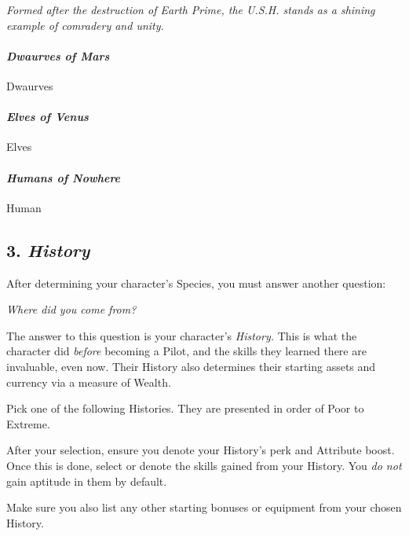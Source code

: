 \documentclass[
]{article}
\begin{document}
\emph{Formed after the destruction of Earth Prime, the U.S.H. stands as
a shining example of comradery and unity.}

\hypertarget{dwaurves-of-mars}{%
\paragraph{\texorpdfstring{\emph{Dwaurves of
Mars}}{Dwaurves of Mars}}\label{dwaurves-of-mars}}

{Dwaurves}

\hypertarget{elves-of-venus}{%
\paragraph{\texorpdfstring{\emph{Elves of
Venus}}{Elves of Venus}}\label{elves-of-venus}}

{Elves}

\hypertarget{humans-of-nowhere}{%
\paragraph{\texorpdfstring{\emph{Humans of
Nowhere}}{Humans of Nowhere}}\label{humans-of-nowhere}}

{Human}

\hypertarget{history}{%
\subsection{\texorpdfstring{3.
\emph{History}}{3. History}}\label{history}}

After determining your character's Species, you must answer another
question:

\emph{Where did you come from?}

The answer to this question is your character's \emph{History.} This is
what the character did \emph{before} becoming a Pilot, and the skills
they learned there are invaluable, even now. Their History also
determines their starting assets and currency via a measure of Wealth.

Pick one of the following Histories. They are presented in order of Poor
to Extreme.

After your selection, ensure you denote your History's perk and
Attribute boost. Once this is done, select or denote the skills gained
from your History. You \emph{do not} gain aptitude in them by default.

Make sure you also list any other starting bonuses or equipment from
your chosen History.
\end{document}
